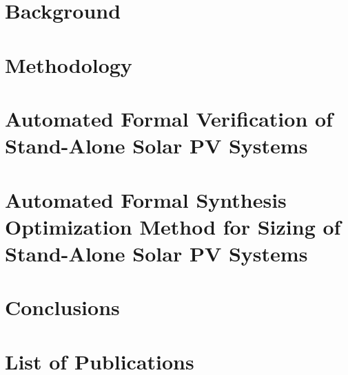 \documentclass[12pt,twoside]{report}
\begin{document}
\chapter{Background}
\label{chap:background}


\chapter{Methodology}
\label{chap:methodology}


\chapter{Automated Formal Verification of Stand-Alone Solar PV Systems}
\label{chap:automatedverification}


\chapter{Automated Formal Synthesis Optimization Method for Sizing of Stand-Alone Solar PV Systems}
\label{chap:automatedsynthesis}


\chapter{Conclusions}
\label{chap:conclusions}


\appendix
\chapter{List of Publications}
\label{chap:publications}


\renewcommand\bibname{References}
{}
\end{document}
